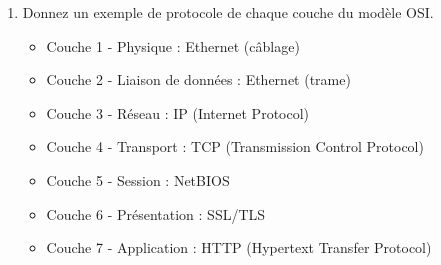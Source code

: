 \documentclass[a4paper,12pt]{article}
\begin{document}
\begin{enumerate}
\begin{itemize}
    \end{itemize}
    \item Donnez un exemple de protocole de chaque couche du modèle OSI.\\
    \begin{itemize}
        \item Couche 1 - Physique : Ethernet (câblage)
        \item Couche 2 - Liaison de données : Ethernet (trame)
        \item Couche 3 - Réseau : IP (Internet Protocol)
        \item Couche 4 - Transport : TCP (Transmission Control Protocol)
        \item Couche 5 - Session : NetBIOS
        \item Couche 6 - Présentation : SSL/TLS
        \item Couche 7 - Application : HTTP (Hypertext Transfer Protocol)
    \end{itemize}
\end{enumerate}
\end{document}
